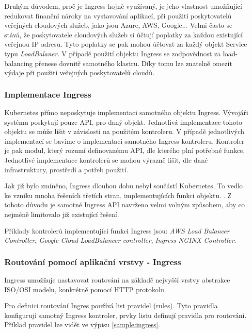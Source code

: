 Druhým důvodem, proč je Ingress hojně využívaný, je jeho vlastnost umožňující redukovat finanční nároky na vystavování aplikací, při použití poskytovatelů veřejných cloudových služeb, jako jsou Azure, AWS, Google... Velmi často se stává, že poskytovatele cloudových služeb si účtují poplatky za každou existující veřejnou IP adresu. Tyto poplatky se pak mohou účtovat za každý objekt Service typu \textit{LoadBalaner}. V případě použití objektu Ingress se zodpovědnost za load-balancing přenese dovnitř samotného klastru. Díky tomu lze znatelně omezit výdaje při použití veřejných poskytovatelů cloudů.

\subsubsection{Implementace Ingress}
Kubernetes přímo neposkytuje implementaci samotného objektu Ingress. Vývojáři systému poskytují pouze API, pro daný objekt. Jednotlivá implementace tohoto objektu se může lišit v závislosti na použitém kontroleru. V případě jednotlivých implementací se bavíme o implementaci samotného Ingress kontroleru. Kontroler je pak modul, který rozumí definovanému API, dle kterého plní potřebné funkce. Jednotlivé implementace kontrolerů se mohou výrazně lišit, dle dané infrastruktury, prostředí a potřeb použití.

Jak již bylo zmíněno, Ingress dlouhou dobu nebyl součástí Kubernetes. To vedlo ke vzniku mnoha řešeních třetích stran, implementujících funkci objektu. \cite{kashin_2021_gateway}. Z tohoto důvodu je samotné Ingress API navrženo velmi volným způsobem, aby co nejméně limitovalo již existující řešení.

Příklady kontrolerů implementující funkci Ingress jsou: \textit{AWS Load Balancer Controller}, \textit{Google-Cloud LoadBalancer controller}, \textit{Ingress NGINX Controller}.\cite{thekubernetesauthors_2023_ingress}

\subsubsection{Routování pomocí aplikační vrstvy - Ingress}
Ingress umožňuje nastavovat routování na základě nejvyšší vrstvy abstrakce ISO/OSI modelu, konkrétně pomocí HTTP protokolu.

Pro definici routování Ingres používá list pravidel (rules). Tyto pravidla konfigurují samotný Ingress kontroler, prvky listu definují pravidla pro routování. Příklad pravidel lze vidět ve výpisu \ref{sample:ingress}.


